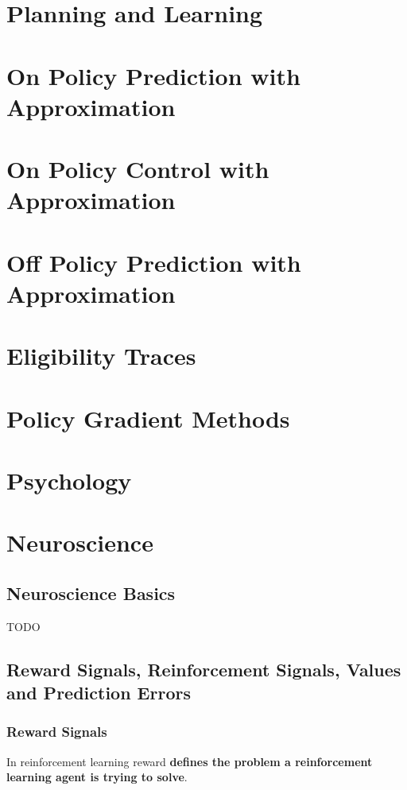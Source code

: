 \documentclass[10pt, landscape, a4paper]{article}
\begin{document}
\begin{multicols}{3}
        \section{Planning and Learning}


        \section{On Policy Prediction with Approximation}


        \section{On Policy Control with Approximation}


        \section{Off Policy Prediction with Approximation}


        \section{Eligibility Traces}


        \section{Policy Gradient Methods}


        \section{Psychology}


        \section{Neuroscience}

        \subsection{Neuroscience Basics}
        TODO

        \subsection{Reward Signals, Reinforcement Signals, Values and Prediction Errors}

        \subsubsection{Reward Signals}
        In reinforcement learning reward \textbf{defines the problem a reinforcement learning agent is trying to solve}.


\end{multicols}
\end{document}
